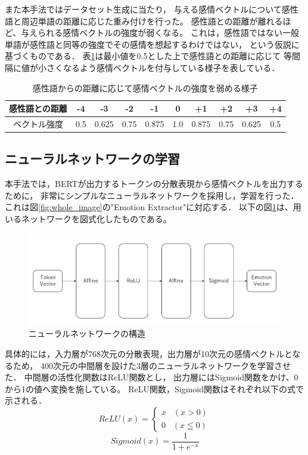 			また本手法ではデータセット生成に当たり，
			与える感情ベクトルについて感性語と周辺単語の距離に応じた重み付けを行った。
			感性語との距離が離れるほど、与えられる感情ベクトルの強度が弱くなる。
			これは，感性語ではない一般単語が感性語と同等の強度でその感情を想起するわけではない，
			という仮説に基づくものである．
			表\ref{table:vector_weaken}は最小値を0.5とした上で感性語との距離に応じて
			等間隔に値が小さくなるよう感情ベクトルを付与している様子を表している．
			\begin{table}[H]
				\centering
				\caption{感性語からの距離に応じて感情ベクトルの強度を弱める様子}
				\label{table:vector_weaken}
					\begin{tabular}{cccccccccc}
						\hline
						感性語との距離 & -4 & -3 & -2 & -1 & 0 & +1 & +2 & +3 & +4 \\
						\hline
						ベクトル強度 & 0.5 & 0.625 & 0.75 & 0.875 & 1.0 & 0.875 & 0.75 & 0.625 & 0.5 \\
						\hline
					\end{tabular}
			\end{table}

		\subsection{ニューラルネットワークの学習}
			本手法では，BERTが出力するトークンの分散表現から感情ベクトルを出力するために，
			非常にシンプルなニューラルネットワークを採用し，学習を行った．
			これは図\ref{fig:whole_image}の"Emotion Extractor"に対応する．
			以下の図\ref{fig:network}は、用いるネットワークを図式化したものである。
			\begin{figure}[H]
				\centering
				\includegraphics[width=\linewidth]{./figure/network.png}
				\caption{ニューラルネットワークの構造}
				\label{fig:network}
			\end{figure}
			具体的には，入力層が768次元の分散表現，出力層が10次元の感情ベクトルとなるため，
			400次元の中間層を設けた3層のニューラルネットワークを学習させた．
			中間層の活性化関数はReLU関数\cite{relu}とし，
			出力層にはSigmoid関数をかけ、0から1の値へ変換を施している。
			ReLU関数，Sigmoid関数はそれぞれ以下の式で示される．
			\begin{equation}
				ReLU(x)=
				\left\{
				\begin{alignedat}{2}
					x\;\;\;(x>0) \\
					0\;\;\;(x\leqq0)
				\end{alignedat}
				\right.
			\end{equation}
			\begin{equation}
				Sigmoid(x)=\frac{1}{1+e^{-x}}
			\end{equation}

